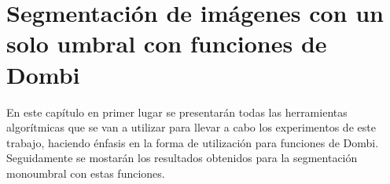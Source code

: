 \documentclass[main]{subfiles}
\begin{document}
\chapter{Segmentación de imágenes con un solo umbral con funciones de Dombi}\label{monoumbral}

En este capítulo en primer lugar se presentarán todas las herramientas algorítmicas que se van a utilizar para llevar a cabo los experimentos de este trabajo, haciendo énfasis en la forma de utilización para funciones de Dombi. Seguidamente se mostarán los resultados obtenidos para la segmentación monoumbral con estas funciones.



\end{document}
